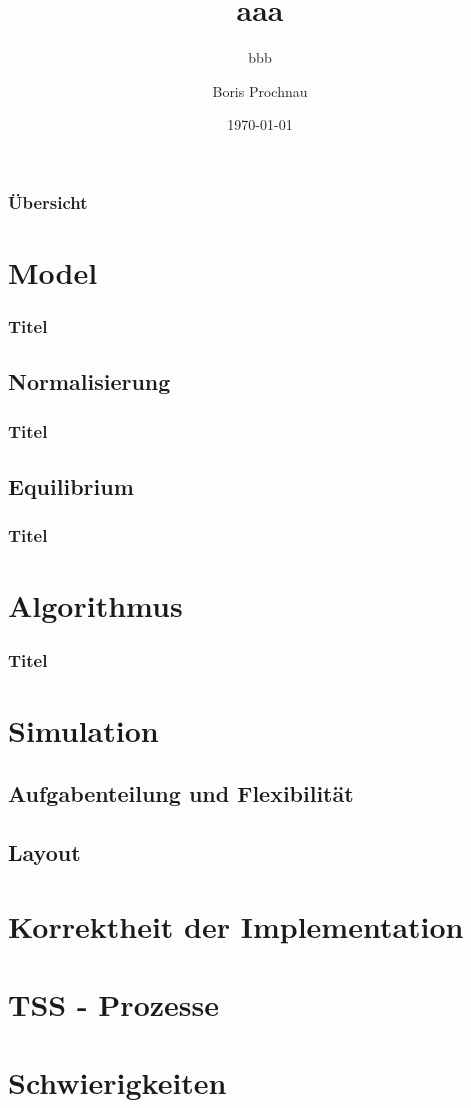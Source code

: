 \documentclass{beamer}
\title[abc] %
{aaa}
\subtitle{bbb}
\author[B.Prochnau] %
{Boris Prochnau}
\institute[University of Bonn]{Institute for Applied Mathematics\\University of Bonn}
\date {\today}
\begin{document}
%
%

\begin{frame}
  \titlepage
\end{frame}



\begin{frame}
  \frametitle{Übersicht}
  \tableofcontents
\end{frame}

\section{Model}
\begin{frame}
\frametitle{Titel}
\end{frame}
	\subsection{Normalisierung}
	\begin{frame}
	\frametitle{Titel}
	\end{frame}
	\subsection{Equilibrium}
	\begin{frame}
	\frametitle{Titel}
	\end{frame}
\section{Algorithmus}
\begin{frame}
\frametitle{Titel}
\end{frame}
\section{Simulation}
	\subsection{Aufgabenteilung und Flexibilität}
	\subsection{Layout}
\section{Korrektheit der Implementation}
\section{TSS - Prozesse}
\section{Schwierigkeiten}
\end{document}
